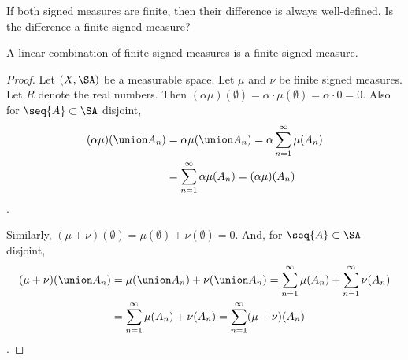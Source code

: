 
\sbasic


























\sstart
{}


If both signed measures are finite,
then their difference is always
well-defined.
Is the difference a finite signed
measure?


\begin{prop}
A linear combination of
finite signed measures is
a finite signed measure.
\begin{proof}
Let $(X,\SA)$ be a measurable space.
Let $\mu$ and $\nu$ be finite signed measures.
Let $R$ denote the real numbers.
Then $(\alpha\mu)(\emptyset) = \alpha \cdot \mu(\emptyset) = \alpha \cdot 0 = 0$.
Also for $\seq{A} \subset \SA$ disjoint,
$$
\begin{aligned}
  (\alpha\mu)(\union A_n) &= \alpha \mu(\union A_n)
  = \alpha \sum_{n = 1}^{\infty} \mu(A_n) \\ &= \sum_{n = 1}^{\infty} \alpha \mu(A_n) = (\alpha\mu)(A_n)
\end{aligned}
$$.

Similarly,
$(\mu + \nu)(\emptyset) = \mu(\emptyset) + \nu(\emptyset) = 0$.
And,
for $\seq{A} \subset \SA$ disjoint,
$$
\begin{aligned}
  (\mu + \nu)(\union A_n) &= \mu(\union A_n) + \nu(\union A_n)
  = \sum_{n = 1}^{\infty} \mu(A_n) +
  \sum_{n = 1}^{\infty} \nu(A_n) \\
  &= \sum_{n = 1}^{\infty} \mu(A_n) + \nu(A_n)
  = \sum_{n = 1}^{\infty} (\mu + \nu)(A_n)
\end{aligned}
$$.
\end{proof}
\end{prop}

